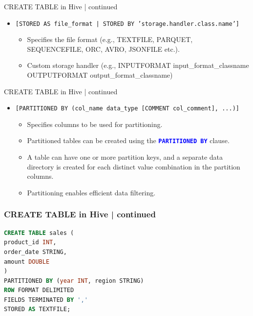   \begin{frame}{CREATE TABLE in Hive | continued}
	\begin{tcolorbox}[colback=white,colframe=black,title= Part 4: File Format and Storage Handler]
		\small
	\begin{itemize}
	  \item \texttt{[STORED AS file\_format | STORED BY 'storage.handler.class.name']}
	  \begin{itemize}
		\item Specifies the file format (e.g., TEXTFILE, PARQUET, SEQUENCEFILE, ORC, AVRO, JSONFILE etc.).
		\item Custom storage handler (e.g., INPUTFORMAT input_format_classname OUTPUTFORMAT output_format_classname)
	  \end{itemize}
	\end{itemize}
	\end{tcolorbox}
  \end{frame}
  \begin{frame}{CREATE TABLE in Hive | continued}
	\begin{tcolorbox}[colback=white,colframe=black,title= Part 5: Table Partitions]
		\small
	\begin{itemize}
	  \item \texttt{[PARTITIONED BY (col\_name data\_type [COMMENT col\_comment], ...)]}
	  \begin{itemize}
		\item Specifies columns to be used for partitioning.
		\vspace{-0.2cm}\item Partitioned tables can be created using the \textcolor{blue}{\textbf{\texttt{PARTITIONED BY}}} clause.
		\vspace{-0.2cm}\item A table can have one or more partition keys, and a separate data directory is created for each distinct value combination in the partition columns.
		\vspace{-0.2cm}\item Partitioning enables efficient data filtering.
		
	  \end{itemize}
	\end{itemize}
	\end{tcolorbox}
  \end{frame}
  \begin{frame}[fragile]
	\frametitle{CREATE TABLE in Hive | continued}
	\begin{tcolorbox}[colback=white,colframe=black,title= Part 5: Table Partitions]
		\small
\begin{lstlisting}[caption={Create Partitioned Table},language=SQL]
CREATE TABLE sales (
product_id INT,
order_date STRING,
amount DOUBLE
)
PARTITIONED BY (year INT, region STRING)
ROW FORMAT DELIMITED
FIELDS TERMINATED BY ','
STORED AS TEXTFILE;
\end{lstlisting}
\end{tcolorbox}

\end{frame}
